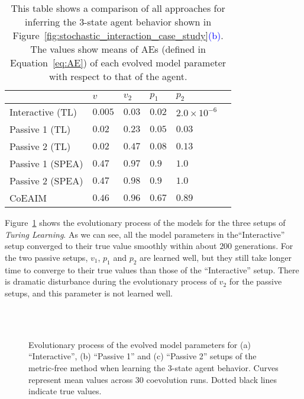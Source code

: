 \begin{table}[!t] 
\caption{This table shows a comparison of all approaches for inferring the 3-state agent behavior shown in Figure~\ref{fig:stochastic_interaction_case_study}\textcolor{blue}{(b)}. The values show means of AEs (defined in Equation~\ref{eq:AE}) of each evolved model parameter with respect to that of the agent.} 
\renewcommand{\arraystretch}{1.1}
\centering %
\begin{tabular}{l l l l l l} %
\hline\hline  %
 & $v$ & $v_2$ & $p_1$ & $p_2$ &  \\  
\hline   %
Interactive (TL) & $0.005$ & $0.03$ & $0.02$ & $2.0\times10^{-6}$ \\ %
Passive 1 (TL) & $0.02$ & $0.23$ & $0.05$ & $0.03$\\ 
Passive 2 (TL) & $0.02$ & $0.47$ & $0.08$ & $0.13$\\ 
Passive 1 (SPEA) & $0.47$ & $0.97$ & $0.9$ & $1.0$\\ 
Passive 2 (SPEA) & $0.47$ & $0.98$ & $0.9$ & $1.0$\\ 
CoEAIM & $0.46$ & $0.96$ & $0.67$ & $0.89$\\
\hline %
\end{tabular} 
\label{table:relative_accuracy_stochastic_3states} 
\end{table} 

Figure~\ref{fig:model_parameters_convergence_stochastic_3states} shows the evolutionary process of the models for the three setups of \textit{Turing Learning}. As we can see, all the model parameters in the``Interactive'' setup converged to their true value smoothly within about $200$ generations. For the two passive setups, $v_1$, $p_1$ and $p_2$ are learned well, but they still take longer time to converge to their true values than those of the ``Interactive'' setup. There is dramatic disturbance during the evolutionary process of $v_2$ for the passive setups, and this parameter is not learned well.

\begin{figure}[!t]%
	\centering
		\\
		\\
		\caption{Evolutionary process of the evolved model parameters for (a) ``Interactive'', (b) ``Passive 1'' and (c) ``Passive 2'' setups of the metric-free method when learning the 3-state agent behavior. Curves represent mean values across 30 coevolution runs. Dotted black lines indicate true values.\label{fig:model_parameters_convergence_stochastic_3states}}
\end{figure}

